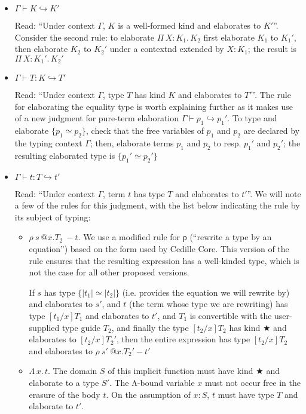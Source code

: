 \documentclass{article}
\newcommand{\ann}[2]{#1\! : \! #2}
\newcommand{\abs}[4]{{#1}\, #2\! : \! #3.\, #4}
\newcommand{\absu}[3]{{#1}\, #2.\, #3}
\newcommand{\elab}{\hookrightarrow}
\begin{document}
\begin{itemize}
\item \(\Gamma \vdash K \elab K'\)

  Read: ``Under context $\Gamma$, $K$ is a well-formed kind and elaborates to
  $K'$''. Consider the second rule: to elaborate \(\abs{Π}{X}{K_1}{K_2}\) first
  elaborate $K_1$ to $K_1'$, then elaborate $K_2$ to $K_2'$ under a contextnd
  extended by $\ann{X}{K_1}$; the result is $\abs{Π}{X}{K_1'}{K_2'}$

\item \(\Gamma \vdash T : K \elab T'\)

  Read: ``Under context $\Gamma$, type $T$ has kind $K$ and elaborates to
  $T'$''. The rule for elaborating the equality type is worth explaining further
  as it makes use of a new judgment for pure-term elaboration $\Gamma \vdash p_1
  \elab p_1'$. To type and elaborate $\{p_1 ≃ p_2\}$, check that the free
  variables of $p_1$ and $p_2$ are declared by the typing context $\Gamma$;
  then, elaborate terms $p_1$ and $p_2$ to resp. $p_1'$ and $p_2'$; the
  resulting elaborated type is $\{p_1' ≃ p_2'\}$

\item \(\Gamma \vdash t : T \elab t'\)

  Read: ``Under context $\Gamma$, term $t$ has type $T$ and elaborates to
  $t'$''. We will note a few of the rules for this judgment, with the list below
  indicating the rule by its subject of typing:

  \begin{itemize}
  \item \(ρ\ s\ @ x.T_2\ - t\). We use a modified rule for ρ (``rewrite a type by an
    equation'') based on the form used by Cedille Core\cite{St18_Cedille-Core}.
    This version of the rule ensures that the resulting expression has a
    well-kinded type, which is not the case for all other proposed versions.

    If $s$ has type \(\{|t_1| ≃ |t_2|\}\) (i.e. provides the equation we will
    rewrite by) and elaborates to $s'$, and $t$ (the term whose type we are
    rewriting) has type \([t_1/x]T_1\) and elaborates to $t'$, and $T_1$
    is convertible with the user-supplied type guide $T_2$, and finally the type
    $[t_2/x]T_2$ has kind $★$ and elaborates to $[t_2/x]T_2'$, then the entire
    expression has type $[t_2/x]T_2$ and elaborates to \(ρ\ s'\ @x.T_2' - t'\)

  \item \(\absu{Λ}{x}{t}\). The domain $S$ of this implicit function must have
    kind $★$ and elaborate to a type $S'$. The Λ-bound variable $x$ must not
    occur free in the erasure of the body $t$. On the assumption of
    $\ann{x}{S}$, $t$ must have type $T$ and elaborate to $t'$.


\end{itemize}
\end{itemize}
\end{document}
